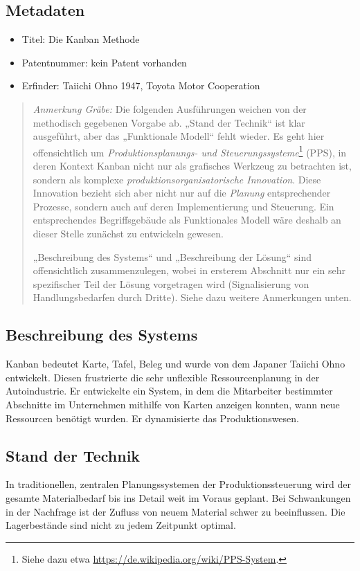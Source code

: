 \documentclass[11pt,a4paper]{article}
\newcommand{\HGG}[1]{\begin{quote} \emph{Anmerkung Gräbe:} #1  \end{quote}}
\begin{document}
\subsection{Metadaten}
\begin{itemize}\itemsep0pt
\item Titel: Die Kanban Methode
\item Patentnummer: kein Patent vorhanden
\item Erfinder: Taiichi Ohno 1947, Toyota Motor Cooperation
\end{itemize}

\HGG{Die folgenden Ausführungen weichen von der methodisch gegebenen Vorgabe
  ab.  „Stand der Technik“ ist klar ausgeführt, aber das „Funktionale Modell“
  fehlt wieder.  Es geht hier offensichtlich um \emph{Produktionsplanungs- und
    Steuerungssysteme}\footnote{Siehe dazu etwa
    \url{https://de.wikipedia.org/wiki/PPS-System}.} (PPS), in deren Kontext
  Kanban nicht nur als grafisches Werkzeug zu betrachten ist, sondern als
  komplexe \emph{produktionsorganisatorische Innovation}.  Diese Innovation
  bezieht sich aber nicht nur auf die \emph{Planung} entsprechender Prozesse,
  sondern auch auf deren Implementierung und Steuerung. Ein entsprechendes
  Begriffsgebäude als Funktionales Modell wäre deshalb an dieser Stelle
  zunächst zu entwickeln gewesen.

  „Beschreibung des Systems“ und „Beschreibung der Lösung“ sind offensichtlich
  zusammenzulegen, wobei in ersterem Abschnitt nur ein sehr spezifischer Teil
  der Lösung vorgetragen wird (Signalisierung von Handlungsbedarfen durch
  Dritte).  Siehe dazu weitere Anmerkungen unten.}

\subsection{Beschreibung des Systems}
Kanban bedeutet Karte, Tafel, Beleg und wurde von dem Japaner Taiichi Ohno
entwickelt. Diesen frustrierte die sehr unflexible Ressourcenplanung in der
Autoindustrie. Er entwickelte ein System, in dem die Mitarbeiter bestimmter
Abschnitte im Unternehmen mithilfe von Karten anzeigen konnten, wann neue
Ressourcen benötigt wurden. Er dynamisierte das Produktionswesen.

\subsection{Stand der Technik}
In traditionellen, zentralen Planungssystemen der Produktionssteuerung wird
der gesamte Materialbedarf bis ins Detail weit im Voraus geplant. Bei
Schwankungen in der Nachfrage ist der Zufluss von neuem Material schwer zu
beeinflussen. Die Lagerbestände sind nicht zu jedem Zeitpunkt optimal.
\end{document}
